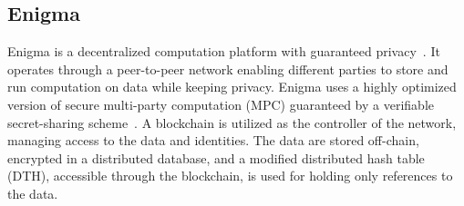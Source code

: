 \subsection{Enigma}\label{bltech:impl:enigma}

Enigma is a decentralized computation platform with guaranteed privacy~\cite{DBLP:journals/corr/ZyskindNP15}. It operates through a peer-to-peer network enabling
different parties to store and run computation on data while keeping privacy. Enigma uses a highly optimized version of secure multi-party computation (MPC)
guaranteed by a verifiable secret-sharing scheme~\cite{DBLP:journals/corr/ZyskindNP15}. A blockchain is utilized as the controller of the network, managing access to the data and identities.
The data are stored off-chain, encrypted in a distributed database, and a modified distributed hash table (DTH), accessible through the blockchain, is used for holding only references to the data.

